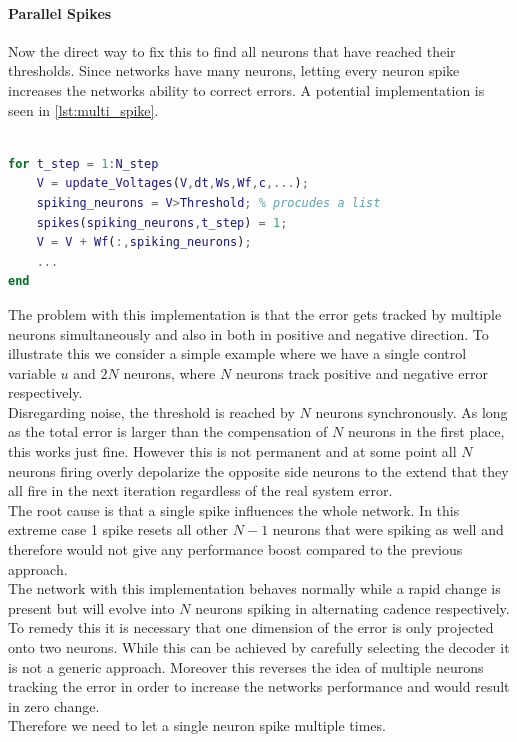 \paragraph{Parallel Spikes}
Now the direct way to fix this to find all neurons that have reached their thresholds. Since networks have many neurons, letting every neuron spike increases the networks ability to correct errors. A potential implementation is seen in \cref{lst:multi_spike}.
\begin{lstlisting}[language=Matlab, caption=Letting every neuron spike in parallel,label=lst:multi_spike]

for t_step = 1:N_step
	V = update_Voltages(V,dt,Ws,Wf,c,...);
	spiking_neurons = V>Threshold; % procudes a list
	spikes(spiking_neurons,t_step) = 1;
	V = V + Wf(:,spiking_neurons);
	...
end
\end{lstlisting}
The problem with this implementation is that the error gets tracked by multiple neurons simultaneously and also in both in positive and negative direction. To illustrate this we consider a simple example where we have a single control variable $u$ and $2N$ neurons, where $N$ neurons track positive and negative error respectively.\\
Disregarding noise, the threshold is reached by $N$ neurons synchronously. As long as the total error is larger than the compensation of $N$ neurons in the first place, this works just fine. However this is not permanent and at some point all $N$ neurons firing overly depolarize the opposite side neurons to the extend that they all fire in the next iteration regardless of the real system error.\\
The root cause is that a single spike influences the whole network. In this extreme case 1 spike resets all other $N-1$ neurons that were spiking as well and therefore would not give any performance boost compared to the previous approach.\\
The network with this implementation behaves normally while a rapid change is present but will evolve into $N$ neurons spiking in alternating cadence respectively.\\
To remedy this it is necessary that one dimension of the error is only projected onto two neurons. While this can be achieved by carefully selecting the decoder it is not a generic approach. Moreover this reverses the idea of multiple neurons tracking the error in order to increase the networks performance and would result in zero change.\\
Therefore we need to let a single neuron spike multiple times.

